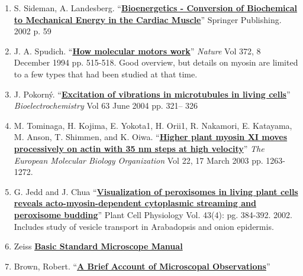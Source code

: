\documentclass{../lab}
\begin{document}
\begin{enumerate}
    \item S. Sideman, A. Landesberg. ``\href{http://physics111.lib.berkeley.edu/Physics111/Reprints/BMC/BMC\_Reprints/BioenergeticsLandesberg.pdf}{\textbf{Bioenergetics - Conversion of Biochemical to Mechanical Energy in the Cardiac Muscle}}'' Springer Publishing. 2002 p. 59

    \item J. A. Spudich. ``\href{http://physics111.lib.berkeley.edu/Physics111/Reprints/BMC/BMC\_Reprints/MolecularMotrs372515a0.pdf}{\textbf{How molecular motors work}}'' \emph{Nature} Vol 372, 8 December 1994 pp. 515-518. Good overview, but details on myosin are limited to a few types that had been studied at that time. 

    \item J. Pokorný. ``\href{http://physics111.lib.berkeley.edu/Physics111/Reprints/BMC/BMC\_Reprints/Langevin\_On\_the\_Theory\_of\_Brownian\_Motion.pdf}{\textbf{Excitation of vibrations in microtubules in living cells}}'' \emph{Bioelectrochemistry} Vol 63 June 2004 pp. 321– 326

    \item M. Tominaga, H. Kojima, E. Yokota1, H. Orii1, R. Nakamori, E. Katayama, M. Anson, T. Shimmen, and K. Oiwa. ``\href{http://physics111.lib.berkeley.edu/Physics111/Reprints/BMC/BMC\_Reprints/HigherPlantMyosin7595042a.pdf}{\textbf{Higher plant myosin XI moves processively on actin with 35 nm steps at high velocity}}'' \emph{The European Molecular Biology Organization} Vol 22, 17 March 2003 pp. 1263-1272. 

    \item G. Jedd and J. Chua ``\href{http://physics111.lib.berkeley.edu/Physics111/Reprints/BMC/BMC\_Reprints/VisualPeroxisomes384.pdf}{\textbf{Visualization of peroxisomes in living plant cells reveals acto-myosin-dependent cytoplasmic streaming and peroxisome budding}}'' Plant Cell Physiology Vol. 43(4): pg. 384-392. 2002. Includes study of vesicle transport in Arabadopsis and onion epidermis. 

    \item Zeiss \href{http://physics111.lib.berkeley.edu/Physics111/Reprints/BMC/BMC\_Reprints/Basic-standard\_microscope.pdf}{\textbf{Basic Standard Microscope Manual}}

    \item Brown, Robert. ``\href{http://physics111.lib.berkeley.edu/Physics111/Reprints/BMC/BMC\_Reprints/Brown\_A\_brief\_account\_of\_microscopical\_observations.pdf}{\textbf{A Brief Account of Microscopal Observations}}''


\end{enumerate}
\end{document}
